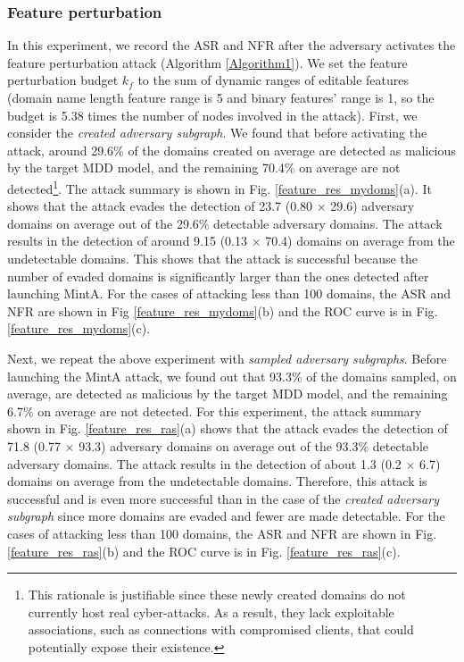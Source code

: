 \documentclass[conference,compsoc]{IEEEtran}
\begin{document}
\subsubsection{Feature perturbation}
\par In this experiment, we record the ASR and NFR after the adversary activates the feature perturbation attack (Algorithm \ref{Algorithm1}). We set the feature perturbation budget $k_f$ to the sum of dynamic ranges of editable features (domain name length feature range is 5 and binary features' range is 1, so the budget is 5.38 times the number of nodes involved in the attack). First, we consider the \textit{created adversary subgraph}. We found that before activating the attack, around 29.6\% of the domains created on average are detected as malicious by the target MDD model, and the remaining 70.4\% on average are not detected\footnote{This rationale is justifiable since these newly created domains do not currently host real cyber-attacks. As a result, they lack exploitable associations, such as connections with compromised clients, that could potentially expose their existence.}. The attack summary is shown in Fig. \ref{feature_res_mydoms}(a). It shows that the attack evades the detection of 23.7 (0.80 $\times$ 29.6) adversary domains on average out of the 29.6\% detectable adversary domains. The attack results in the detection of around 9.15 (0.13 $\times$ 70.4) domains on average from the undetectable domains. This shows that the attack is successful because the number of evaded domains is significantly larger than the ones detected after launching MintA. For the cases of attacking less than 100 domains, the ASR and NFR are shown in Fig \ref{feature_res_mydoms}(b) and the ROC curve is in Fig. \ref{feature_res_mydoms}(c). 

\par Next, we repeat the above experiment with \textit{sampled adversary subgraphs}. Before launching the MintA attack, we found out that 93.3\% of the domains sampled, on average, are detected as malicious by the target MDD model, and the remaining 6.7\% on average are not detected. For this experiment, the attack summary shown in Fig. \ref{feature_res_ras}(a) shows that the attack evades the detection of 71.8 (0.77 $\times$ 93.3) adversary domains on average out of the 93.3\% detectable adversary domains. The attack results in the detection of about 1.3 (0.2 $\times$ 6.7) domains on average from the undetectable domains. Therefore, this attack is successful and is even more successful than in the case of the \textit{created adversary subgraph} since more domains are evaded and fewer are made detectable. For the cases of attacking less than 100 domains, the ASR and NFR are shown in Fig. \ref{feature_res_ras}(b) and the ROC curve is in Fig. \ref{feature_res_ras}(c).
\end{document}
